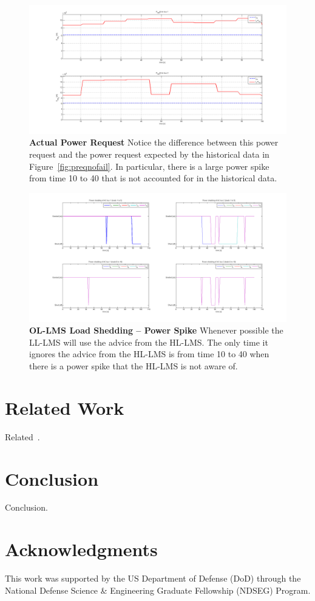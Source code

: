 \documentclass{acm_proc_article-sp}
\begin{document}
\begin{figure}[ht]
  \centering
  \includegraphics[width=0.9\columnwidth]{figures/preqpwrspike.png}
  \caption{\textbf{Actual Power Request} Notice the difference between this power
  request and the power request expected by the historical data in 
  Figure~\ref{fig:preqnofail}. In particular, there is a large power spike from time 10
  to 40 that is not accounted for in the historical data.}
  \label{fig:preqpwrspike}
\end{figure}
\begin{figure}[ht]
  \centering
  \includegraphics[width=0.9\columnwidth]{figures/lsolonefail.png}
  \caption{\textbf{OL-LMS Load Shedding -- Power Spike} Whenever possible the LL-LMS will
  use the advice from the HL-LMS. The only time it ignores the advice from the HL-LMS is
  from time 10 to 40 when there is a power spike that the HL-LMS is not aware of.}
  \label{fig:lsolpwrspike}
\end{figure}

\section{Related Work}
Related~\cite{Lamport:LaTeX}.

\section{Conclusion}
Conclusion.

\section*{Acknowledgments}
This work was supported by the US Department of Defense (DoD) through the National Defense Science \& Engineering Graduate Fellowship (NDSEG) Program.


 
\end{document}
